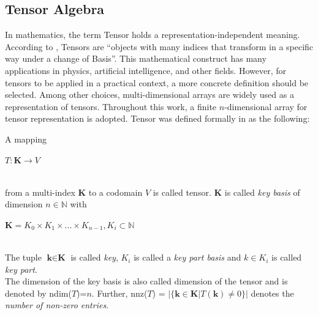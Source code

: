\subsection{Tensor Algebra}
\label{sec:tensor_algebra}
In mathematics, the term Tensor holds a representation-independent meaning. According to \cite{kj}, Tensors are “objects with many indices that transform in a specific way under a change of
Basis”. This mathematical construct has many applications in physics, artificial intelligence, and other fields. However, for tensors to be applied in a practical context, a more concrete definition should be selected. Among other choices, multi-dimensional arrays are widely used as a representation of tensors. Throughout this work, a finite $n$-dimensional array for tensor representation is adopted.
Tensor was defined formally in \cite{tentris2020} as the following:

\begin{definition}[Tensor]
A mapping\\
\centerline{$T: \textbf{K} \to V$}\\
from a multi-index $\textbf{K}$ to a codomain $V$ is called tensor. $\textbf{K}$ is called \textit{key basis} of dimension $n \in \mathbb{N}$ with \\
\centerline{ $\textbf{K} = K_0 \times K_1 \times ... \times K_{n-1}, K_i \subset \mathbb{N}$ } \\
The tuple $\textbf{k} \in \textbf{K}$ is called \textit{key}, $K_i$ is called a \textit{key part basis} and $k \in K_i$ is called \textit{key part}.\\
The dimension of the key basis is also called dimension of the tensor and is denoted by ndim($T$)=$n$. Further, nnz($T$) = $|\{\textbf{k} \in \textbf{K} | T(\textbf{k})  \neq 0\}|$ denotes the \textit{ number of non-zero entries}.
\end{definition} 


